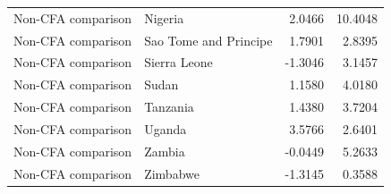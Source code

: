 \begin{table}
\begin{tabular}[t]{llrr}
Non-CFA comparison & Nigeria & 2.0466 & 10.4048\\
Non-CFA comparison & Sao Tome and Principe & 1.7901 & 2.8395\\
Non-CFA comparison & Sierra Leone & -1.3046 & 3.1457\\
\addlinespace
Non-CFA comparison & Sudan & 1.1580 & 4.0180\\
Non-CFA comparison & Tanzania & 1.4380 & 3.7204\\
Non-CFA comparison & Uganda & 3.5766 & 2.6401\\
Non-CFA comparison & Zambia & -0.0449 & 5.2633\\
Non-CFA comparison & Zimbabwe & -1.3145 & 0.3588\\
\bottomrule
\end{tabular}
\end{table}